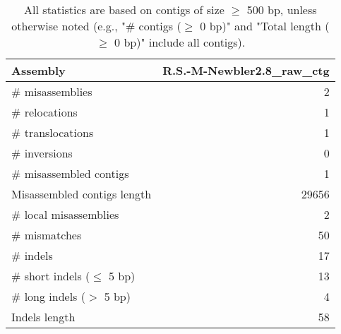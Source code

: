 \documentclass[12pt,a4paper]{article}
\begin{document}
\begin{table}[ht]
\begin{center}
\caption{All statistics are based on contigs of size $\geq$ 500 bp, unless otherwise noted (e.g., "\# contigs ($\geq$ 0 bp)" and "Total length ($\geq$ 0 bp)" include all contigs).}
\begin{tabular}{|l*{1}{|r}|}
\hline
Assembly & R.S.-M-Newbler2.8\_raw\_ctg \\ \hline
\# misassemblies & 2 \\ \hline
\hspace{5mm}\# relocations & 1 \\ \hline
\hspace{5mm}\# translocations & 1 \\ \hline
\hspace{5mm}\# inversions & 0 \\ \hline
\# misassembled contigs & 1 \\ \hline
Misassembled contigs length & 29656 \\ \hline
\# local misassemblies & 2 \\ \hline
\# mismatches & 50 \\ \hline
\# indels & 17 \\ \hline
\hspace{5mm}\# short indels ($\leq$ 5 bp) & 13 \\ \hline
\hspace{5mm}\# long indels ($>$ 5 bp) & 4 \\ \hline
Indels length & 58 \\ \hline
\end{tabular}
\end{center}
\end{table}
\end{document}
